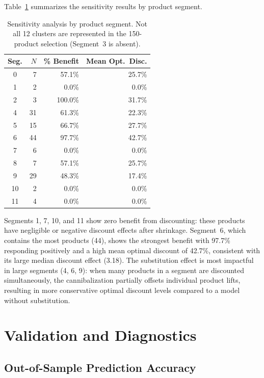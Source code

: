 \documentclass[12pt,a4paper]{article}
\begin{document}
Table~\ref{tab:sensitivity-segment} summarizes the sensitivity results
by product segment.

\begin{table}[H]
\centering
\caption{Sensitivity analysis by product segment. Not all 12
clusters are represented in the 150-product selection (Segment~3
is absent).}
\label{tab:sensitivity-segment}
\begin{tabular}{cr rr}
\toprule
\textbf{Seg.} & \textbf{$N$} & \textbf{\% Benefit} &
\textbf{Mean Opt.\ Disc.} \\
\midrule
0 & 7 & 57.1\% & 25.7\% \\
1 & 2 & 0.0\% & 0.0\% \\
2 & 3 & 100.0\% & 31.7\% \\
4 & 31 & 61.3\% & 22.3\% \\
5 & 15 & 66.7\% & 27.7\% \\
6 & 44 & 97.7\% & 42.7\% \\
7 & 6 & 0.0\% & 0.0\% \\
8 & 7 & 57.1\% & 25.7\% \\
9 & 29 & 48.3\% & 17.4\% \\
10 & 2 & 0.0\% & 0.0\% \\
11 & 4 & 0.0\% & 0.0\% \\
\bottomrule
\end{tabular}
\end{table}

Segments 1, 7, 10, and 11 show zero benefit from discounting:
these products have negligible or negative discount effects after
shrinkage. Segment~6, which contains the most products (44),
shows the strongest benefit with 97.7\% responding positively and a
high mean optimal discount of 42.7\%, consistent with its large
median discount effect (3.18). The substitution effect is most
impactful in large segments (4, 6, 9): when many products in a segment
are discounted simultaneously, the cannibalization partially offsets
individual product lifts, resulting in more conservative optimal
discount levels compared to a model without substitution.

\section{Validation and Diagnostics}
\label{sec:validation}

\subsection{Out-of-Sample Prediction Accuracy}
\end{document}
